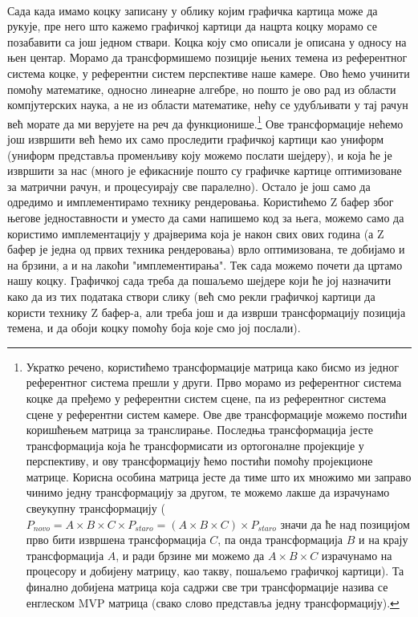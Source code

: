 \documentclass[12pt]{article}
\begin{document}
	\paragraph{}
	Сада када имамо коцку записану у облику којим графичка картица може да рукује, пре него што кажемо графичкој картици да нацрта коцку морамо се позабавити са још једном ствари. Коцка коју смо описали је описана у односу на њен центар. Морамо да трансформишемо позиције њених темена из референтног система коцке, у референтни систем перспективе наше камере. Ово ћемо учинити помоћу математике, односно линеарне алгебре, но пошто је ово рад из области компјутерских наука, а не из области математике, нећу се удубљивати у тај рачун већ морате да ми верујете на реч да функционише.\footnote{Укратко речено, користићемо трансформације матрица како бисмо из једног референтног система прешли у други. Прво морамо из референтног система коцке да пређемо у референтни систем сцене, па из референтног система сцене у референтни систем камере. Ове две трансформације можемо постићи коришћењем матрица за транслирање. Последња трансформација јесте трансформација која ће трансформисати из ортогоналне пројекције у перспективу, и ову трансформацију ћемо постићи помоћу пројекционе матрице. Корисна особина матрица јесте да тиме што их множимо ми заправо чинимо једну трансформацију за другом, те можемо лакше да израчунамо свеукупну трансформацију ($P_{novo} = A\times B\times C\times P_{staro} = (A\times B\times C) \times P_{staro}$ значи да ће над позицијом прво бити извршена трансформација $C$, па онда трансформација $B$ и на крају трансформација $A$, и ради брзине ми можемо да $A\times B\times C$ израчунамо на процесору и добијену матрицу, као такву, пошаљемо графичкој картици). Та финално добијена матрица која садржи све три трансформације назива се енглеском MVP матрица (свако слово представља једну трансформацију).} Ове трансформације нећемо још извршити већ ћемо их само проследити графичкој картици као униформ (униформ представља променљиву коју можемо послати шејдеру), и која ће је извршити за нас (много је ефикасније пошто су графичке картице оптимизоване за матрични рачун,  и процесуирају све паралелно).  Остало је још само да одредимо и имплементирамо технику рендеровања. Користићемо Z бафер због његове једноставности и уместо да сами напишемо код за њега, можемо само да користимо имплементацију у драјверима која је након свих ових година (а Z бафер је једна од првих техника рендеровања) врло оптимизована, те добијамо и на брзини, а и на лакоћи "имплементирања". Тек сада можемо почети да цртамо нашу коцку. Графичкој сада треба да пошаљемо шејдере који ће јој назначити како да из тих података створи слику (већ смо рекли графичкој картици да користи технику Z бафер-а, али треба још и да изврши трансформацију позиција темена, и да обоји коцку помоћу боја које смо јој послали).
	
\end{document}
